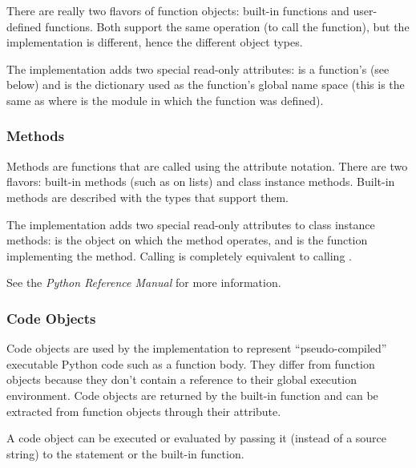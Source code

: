 There are really two flavors of function objects: built-in functions
and user-defined functions.  Both support the same operation (to call
the function), but the implementation is different, hence the
different object types.

The implementation adds two special read-only attributes:
 is a function's  (see below) and  is
the dictionary used as the function's global name space (this is the
same as  where  is the module in which
the function  was defined).


\subsubsection{Methods \label{typesmethods}}

Methods are functions that are called using the attribute notation.
There are two flavors: built-in methods (such as  on
lists) and class instance methods.  Built-in methods are described
with the types that support them.

The implementation adds two special read-only attributes to class
instance methods:  is the object on which the
method operates, and  is the function
implementing the method.  Calling  is completely equivalent to
calling .

See the \emph{Python Reference Manual} for more information.


\subsubsection{Code Objects \label{bltin-code-objects}}

Code objects are used by the implementation to represent
``pseudo-compiled'' executable Python code such as a function body.
They differ from function objects because they don't contain a
reference to their global execution environment.  Code objects are
returned by the built-in  function and can be
extracted from function objects through their 
attribute.

A code object can be executed or evaluated by passing it (instead of a
source string) to the  statement or the built-in
 function.

